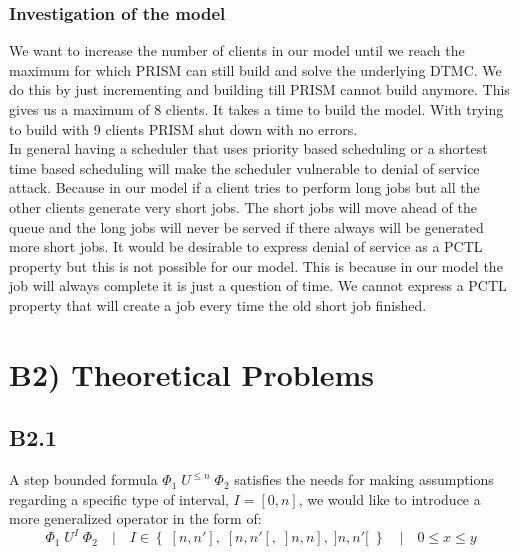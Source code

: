 \documentclass[12pt]{report}
\begin{document}
\subsubsection*{Investigation of the model}
We want to increase the number of clients in our model until we reach the maximum for which PRISM can still build and solve the underlying DTMC. We do this by just incrementing and building till PRISM cannot build anymore. This gives us a maximum of 8 clients. It takes a time to build the model. With trying to build with 9 clients PRISM shut down with no errors.\\
In general having a scheduler that uses priority based scheduling or a shortest time based scheduling will make the scheduler vulnerable to denial of service attack. Because in our model  if a client tries to perform long jobs but all the other clients generate very short jobs. The short jobs will move ahead of the queue and the long jobs will never be served if there always will be generated more short jobs. It would be desirable to express denial of service as a PCTL property but this is not possible for our model. This is because in our model the job will always complete it is just a question of time. We cannot express a PCTL property that will create a job every time the old short job finished.

\section*{B2) Theoretical Problems}
\subsection*{B2.1}
A step bounded formula $\Phi_1\;U^{\leqslant n}\;\Phi_2$ satisfies the needs for making assumptions regarding a specific type of interval, $I = [0, n]$, we would like to introduce a more generalized operator in the form of:
$$\Phi_1\;U^{I}\;\Phi_2 \quad | \quad I \in \left\{\;[n,n'],\;[n, n'[,\;]n, n],\;]n, n'[\;\right\} \quad | \quad 0 \leq x \leq y$$
\end{document}
